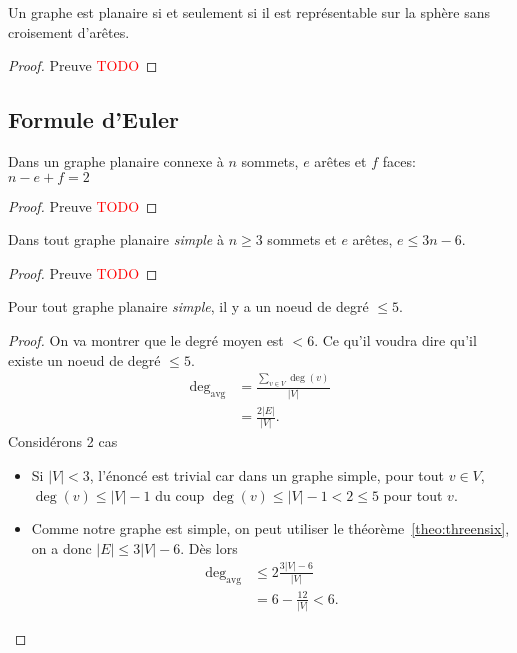 \begin{mytheo}
  Un graphe est planaire si et seulement si il est représentable sur la sphère sans croisement d'arêtes.
  \begin{proof}
    Preuve \textcolor{red}{TODO}
  \end{proof}
\end{mytheo}



\subsection{Formule d'Euler}
\begin{mytheo} 
  Dans un graphe planaire connexe à $n$ sommets, $e$ arêtes et $f$ faces:\\
  $n−e+f =2$
  \begin{proof}
    Preuve \textcolor{red}{TODO}
  \end{proof}
\end{mytheo}

\begin{mytheo}
  \label{theo:threensix}
  Dans tout graphe planaire \emph{simple} à $n \geq 3$ sommets et $e$ arêtes,
  $e \leq 3n - 6$.
  \begin{proof}
    Preuve \textcolor{red}{TODO}
  \end{proof}
\end{mytheo}

\begin{mytheo}
  Pour tout graphe planaire \emph{simple}, il y a un noeud de degré $\leq 5$.
  \begin{proof}
    On va montrer que le degré moyen est $< 6$.
    Ce qu'il voudra dire qu'il existe un noeud de degré $\leq 5$.
    \begin{align*}
      \deg_{\mathrm{avg}} & = \frac{\sum_{v\in V} \deg(v)}{|V|}\\
                          & = \frac{2|E|}{|V|}.
    \end{align*}
    Considérons 2 cas
    \begin{itemize}
      \item Si $|V| < 3$, l'énoncé est trivial car dans un graphe simple,
        pour tout $v \in V$, $\deg(v) \leq |V|-1$ du coup
        $\deg(v) \leq |V| - 1 < 2 \leq 5$ pour tout $v$.
      \item
        Comme notre graphe est simple,
        on peut utiliser le théorème~\ref{theo:threensix},
        on a donc $|E| \leq 3|V| - 6$.
        Dès lors
        \begin{align*}
          \deg_{\mathrm{avg}} & \leq 2\frac{3|V|-6}{|V|}\\
                              & = 6 - \frac{12}{|V|} < 6.
        \end{align*}
    \end{itemize}
  \end{proof}
\end{mytheo}

